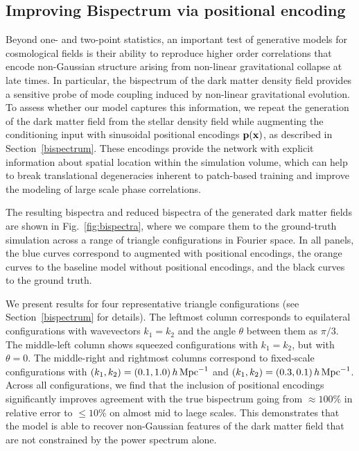 \subsection{Improving Bispectrum via positional encoding}

Beyond one- and two-point statistics, an important test of generative models for cosmological fields is their ability to reproduce higher order correlations that encode non-Gaussian structure arising from non-linear gravitational collapse at late times. In particular, the bispectrum of the dark matter density field provides a sensitive probe of mode coupling induced by non-linear gravitational evolution.
To assess whether our model captures this information, we repeat the generation of the dark matter field from the stellar density field while augmenting the conditioning input with sinusoidal positional encodings
$\textbf{p}(\textbf{x})$, as described in Section~\ref{bispectrum}. These encodings provide the network with explicit information about spatial location within the simulation volume, which can help to break translational degeneracies inherent to patch-based training and improve the modeling of large scale phase correlations.

The resulting bispectra and reduced bispectra of the generated dark matter fields are shown in Fig.~\ref{fig:bispectra}, where we compare them to the ground-truth simulation across a range of triangle configurations in Fourier space. In all panels, the blue curves correspond to \FOLD augmented with positional encodings, the orange curves to the baseline \FOLD model without positional encodings, and the black curves to the ground truth.

We present results for four representative triangle configurations (see Section~\ref{bispectrum} for details). The leftmost column corresponds to equilateral configurations with wavevectors ${k_1}={k_2}$ and the angle $\theta$ between them as $\pi/3$. The middle-left column shows squeezed configurations with ${k_1}={k_2}$, but with $\theta=0$. The middle-right and rightmost columns correspond to fixed-scale configurations with $({k_1},{k_2})=(0.1,1.0)\,h\,\mathrm{Mpc}^{-1}$ and $({k_1},{k_2})=(0.3,0.1)\,h\,\mathrm{Mpc}^{-1}$.
Across all configurations, we find that the inclusion of positional encodings significantly improves agreement with the true bispectrum going from $\approx100\%$ in relative error to $\leq10\%$ on almost mid to laege scales. This demonstrates that the model is able to recover non-Gaussian features of the dark matter field that are not constrained by the power spectrum alone.

